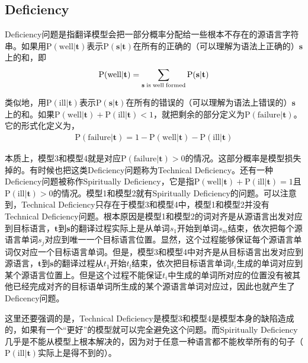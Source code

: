 \subsection{Deficiency}

\parinterval Deficiency问题是指翻译模型会把一部分概率分配给一些根本不存在的源语言字符串。如果用$\textrm{P}(\textrm{well}|\mathbf{t})$表示$\textrm{P}(\mathbf{s}| \mathbf{t})$在所有的正确的（可以理解为语法上正确的）$\mathbf{s}$上的和，即
\begin{eqnarray}
\textrm{P}(\textrm{well}|\mathbf{t})=\sum_{\mathbf{s}\textrm{\;is\;well\;formed}}{\textrm{P}(\mathbf{s}| \mathbf{t})}
\label{eq:3-62}
\end{eqnarray}

\parinterval 类似地，用$\textrm{P}(\textrm{ill}|\mathbf{t})$表示$\textrm{P}(\mathbf{s}| \mathbf{t})$在所有的错误的（可以理解为语法上错误的）$\mathbf{s}$上的和。如果$\textrm{P}(\textrm{well}|\mathbf{t})+ \textrm{P}(\textrm{ill}|\mathbf{t})<1$，就把剩余的部分定义为$\textrm{P}(\textrm{failure}|\mathbf{t})$。它的形式化定义为，
\begin{eqnarray}
\textrm{P}({\textrm{failure}|\mathbf{t}})  = 1 - \textrm{P}({\textrm{well}|\mathbf{t}}) - \textrm{P}({\textrm{ill}|\mathbf{t}})
\label{eq:3-63}
\end{eqnarray}

\parinterval 本质上，模型3和模型4就是对应$\textrm{P}({\textrm{failure}|\mathbf{t}})>0$的情况。这部分概率是模型损失掉的。有时候也把这类Deficiency问题称为Technical Deficiency。还有一种Deficiency问题被称作Spiritually Deficiency，它是指$\textrm{P}({\textrm{well}|\mathbf{t}}) + \textrm{P}({\textrm{ill}|\mathbf{t}}) = 1$且$\textrm{P}({\textrm{ill}|\mathbf{t}}) > 0$的情况。模型1和模型2就有Spiritually Deficiency的问题。可以注意到，Technical Deficiency只存在于模型3和模型4中，模型1和模型2并没有Technical Deficiency问题。根本原因是模型1和模型2的词对齐是从源语言出发对应到目标语言，$\mathbf{t}$到$\mathbf{s}$的翻译过程实际上是从单词$s_1$开始到单词$s_m$结束，依次把每个源语言单词$s_j$对应到唯一一个目标语言位置。显然，这个过程能够保证每个源语言单词仅对应一个目标语言单词。但是，模型3和模型4中对齐是从目标语言出发对应到源语言，$\mathbf{t}$到$\mathbf{s}$的翻译过程从$t_1$开始$t_l$结束，依次把目标语言单词$t_i$生成的单词对应到某个源语言位置上。但是这个过程不能保证$t_i$中生成的单词所对应的位置没有被其他已经完成对齐的目标语单词所生成的某个源语言单词对应过，因此也就产生了Deficency问题。

\parinterval 这里还要强调的是，Technical Deficiency是模型3和模型4是模型本身的缺陷造成的，如果有一个``更好''的模型就可以完全避免这个问题。而Spiritually Deficiency几乎是不能从模型上根本解决的，因为对于任意一种语言都不能枚举所有的句子（$\textrm{P}({\textrm{ill}|\mathbf{t}})$实际上是得不到的）。

